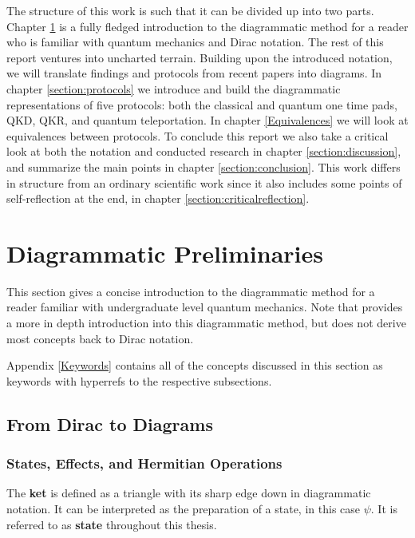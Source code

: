 \documentclass[]{article}
\begin{document}
The structure of this work is such that it can be divided up into two parts. Chapter \ref{section:preliminaries} is a fully fledged introduction to the diagrammatic method for a reader who is familiar with quantum mechanics and Dirac notation. The rest of this report ventures into uncharted terrain. Building upon the introduced notation, we will translate findings and protocols from recent papers into diagrams. In chapter \ref{section:protocols} we introduce and build the diagrammatic representations of five protocols: both the classical and quantum one time pads, QKD, QKR, and quantum teleportation. In chapter \ref{Equivalences} we will look at equivalences between protocols. To conclude this report we also take a critical look at both the notation and conducted research in chapter \ref{section:discussion}, and summarize the main points in chapter \ref{section:conclusion}. This work differs in structure from an ordinary scientific work since it also includes some points of self-reflection at the end, in chapter \ref{section:criticalreflection}.
 
\section{Diagrammatic Preliminaries}
\label{section:preliminaries}

This section gives a concise introduction to the diagrammatic method for a reader familiar with undergraduate level quantum mechanics. Note that \cite{Coecke2017} provides a more in depth introduction into this diagrammatic method, but does not derive most concepts back to Dirac notation. 

Appendix \ref{Keywords} contains all of the concepts discussed in this section as keywords with hyperrefs to the respective subsections.

\subsection{From Dirac to Diagrams}

\subsubsection{States, Effects, and Hermitian Operations}

\label{braandket}
The \textbf{ket} is defined as a triangle with its sharp edge down in diagrammatic notation. It can be interpreted as the preparation of a state, in this case $\psi$. It is referred to as \textbf{state} throughout this thesis.
\end{document}
